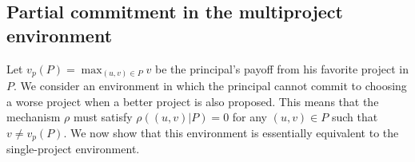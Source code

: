 \documentclass[12pt,english]{article}
\newcommand{\eran}[1]{\begin{framed}{\noindent {\bf Eran:} #1}\end{framed}}
\theoremstyle{remark}
\theoremstyle{plain}
\theoremstyle{definition}
\begin{document}
\subsection{Partial commitment in the multiproject environment}\label{sec:partial}
Let $v_p(P)=\max_{(u,v)\in P} v$ be the principal's payoff from his favorite project in $P$. We consider an environment in which the principal cannot commit to choosing a worse project when a better project is also proposed. This means that the mechanism $\rho$ must satisfy $\rho((u,v)|P)=0$ for any $(u,v)\in P$ such that $v \neq v_p(P)$. We now show that this environment is essentially equivalent to the single-project environment.
\end{document}
